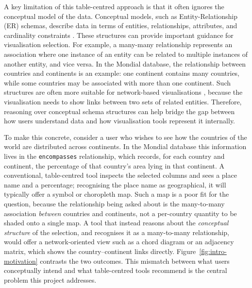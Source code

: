 A key limitation of this table-centred approach is that it often ignores the conceptual model of the data. Conceptual models, such as Entity-Relationship (ER) schemas, describe data in terms of entities, relationships, attributes, and cardinality constraints \cite{brientowards}. These structures can provide important guidance for visualisation selection. For example, a many-many relationship represents an association where one instance of an entity can be related to multiple instances of another entity, and vice versa. In the Mondial database, the relationship between countries and continents is an example: one continent contains many countries, while some countries may be associated with more than one continent. Such structures are often more suitable for network-based visualisations \cite{brientowards}, because the visualisation needs to show links between two sets of related entities. Therefore, reasoning over conceptual schema structures can help bridge the gap between how users understand data and how visualisation tools represent it internally.

To make this concrete, consider a user who wishes to see how the countries of the world are distributed across continents. In the Mondial database this information lives in the \texttt{encompasses} relationship, which records, for each country and continent, the percentage of that country's area lying in that continent. A conventional, table-centred tool inspects the selected columns and sees a place name and a percentage; recognising the place name as geographical, it will typically offer a symbol or choropleth map. Such a map is a poor fit for the question, because the relationship being asked about is the many-to-many association \emph{between} countries and continents, not a per-country quantity to be shaded onto a single map. A tool that instead reasons about the \emph{conceptual structure} of the selection, and recognises it as a many-to-many relationship, would offer a network-oriented view such as a chord diagram or an adjacency matrix, which shows the country--continent links directly. Figure~\ref{fig:intro-motivation} contrasts the two outcomes. This mismatch between what users conceptually intend and what table-centred tools recommend is the central problem this project addresses.


